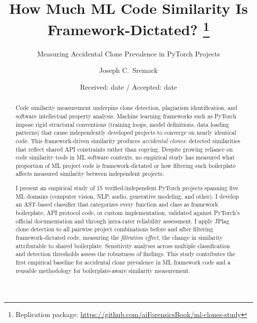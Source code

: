 \documentclass[smallextended,natbib]{svjour3}
\begin{document}
\title{How Much ML Code Similarity Is Framework-Dictated?
\thanks{Replication package: \url{https://github.com/aiForensicsBook/ml-clones-study}}}
\subtitle{Measuring Accidental Clone Prevalence in PyTorch Projects}


\author{Joseph C.\ Sremack}



\date{Received: date / Accepted: date}

\maketitle

\begin{abstract}
Code similarity measurement underpins clone detection, plagiarism identification, and software intellectual property analysis. Machine learning frameworks such as PyTorch impose rigid structural conventions (training loops, model definitions, data loading patterns) that cause independently developed projects to converge on nearly identical code. This framework-driven similarity produces \emph{accidental clones}: detected similarities that reflect shared API constraints rather than copying. Despite growing reliance on code similarity tools in ML software contexts, no empirical study has measured what proportion of ML project code is framework-dictated or how filtering such boilerplate affects measured similarity between independent projects.

I present an empirical study of 15 verified-independent PyTorch projects spanning five ML domains (computer vision, NLP, audio, generative modeling, and other). I develop an AST-based classifier that categorizes every function and class as framework boilerplate, API protocol code, or custom implementation, validated against PyTorch's official documentation and through intra-rater reliability assessment. I apply JPlag clone detection to all pairwise project combinations before and after filtering framework-dictated code, measuring the \emph{filtration effect}, the change in similarity attributable to shared boilerplate. Sensitivity analyses across multiple classification and detection thresholds assess the robustness of findings. This study contributes the first empirical baseline for accidental clone prevalence in ML framework code and a reusable methodology for boilerplate-aware similarity measurement.
\end{abstract}
\end{document}
